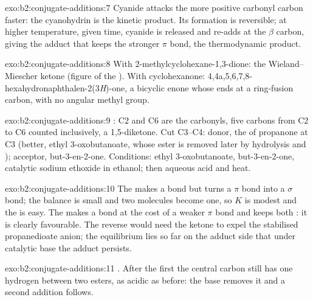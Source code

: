 \begin{solution}{exo:b2:conjugate-additions:7}
Cyanide attacks the more positive carbonyl carbon faster: the cyanohydrin is the kinetic product. Its
formation is reversible; at higher temperature, given time, cyanide is released and re-adds at the
$\beta$ carbon, giving the adduct that keeps the stronger  $\pi$ bond, the thermodynamic product.
\end{solution}

\begin{solution}{exo:b2:conjugate-additions:8}
With 2-methylcyclohexane-1,3-dione: the Wieland--Miescher ketone (figure of the ).
With cyclohexanone: 4,4a,5,6,7,8-hexahydronaphthalen-2(3\textit{H})-one, a bicyclic enone whose
 ends at a ring-fusion carbon, with no angular methyl group.
\end{solution}

\begin{solution}{exo:b2:conjugate-additions:9}
: C2 and C6 are the carbonyls, five carbons from C2 to C6 counted inclusively,
a 1,5-diketone. Cut C3--C4: donor, the  of propanone at C3 (better, ethyl 3-oxobutanoate, whose
ester is removed later by hydrolysis and ); acceptor, but-3-en-2-one. Conditions:
ethyl 3-oxobutanoate, but-3-en-2-one, catalytic sodium ethoxide in ethanol; then aqueous acid and
heat.
\end{solution}

\begin{solution}{exo:b2:conjugate-additions:10}
The  makes a  bond but turns a  $\pi$ bond into a  $\sigma$ bond; the
balance is small and two molecules become one, so $K$ is modest and the  is easy. The
 makes a  bond at the cost of a weaker  $\pi$ bond and keeps both
: it is clearly favourable. The reverse would need the ketone  to expel the stabilised propanedioate anion; the
equilibrium lies so far on the adduct side that under catalytic base the adduct persists.
\end{solution}

\begin{solution}{exo:b2:conjugate-additions:11}
. After the first  the central carbon still has one
hydrogen between two esters, as acidic as before: the base removes it and a second addition follows.
\end{solution}

